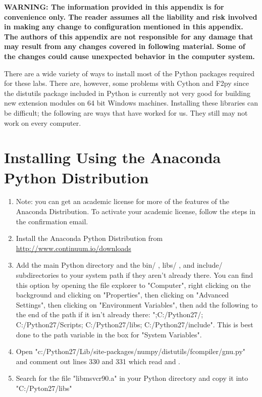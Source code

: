 \label{win64install}


\textbf{{\large WARNING:} The information provided in this appendix is for convenience only.
The reader assumes all the liability and risk involved in making any change to configuration mentioned in this appendix.
The authors of this appendix are not responsible for any damage that may result from any changes covered in following material.
Some of the changes could cause unexpected behavior in the computer system.}

There are a wide variety of ways to install most of the Python packages required for these labs.
There are, however, some problems with Cython and F2py since the distutils package included in Python is currently not very good for building new extension modules on 64 bit Windows machines.
Installing these libraries can be difficult; the following are ways that have worked for us.
They still may not work on every computer.

\section*{Installing Using the Anaconda Python Distribution}
\begin{enumerate}
\item Note: you can get an academic license for more of the features of the Anaconda Distribution.
To activate your academic license, follow the steps in the confirmation email.

\item Install the Anaconda Python Distribution from \url{http://www.continuum.io/downloads}

\item Add the main Python directory and the bin/ , libs/ , and include/ subdirectories to your system path if they aren't already there.
You can find this option by opening the file explorer to "Computer", right clicking on the background and clicking on "Properties", then clicking on "Advanced Settings", then clicking on "Environment Variables", then add the following to the end of the path if it isn't already there: ";C:/Python27/; C:/Python27/Scripts; C:/Python27/libs; C:/Python27/include". This is best done to the path variable in the box for "System Variables".

\item Open "c:/Python27/Lib/site-packages/numpy/distutils/fcompiler/gnu.py" and comment out lines 330 and 331 which read  and .

\item Search for the file "libmsvcr90.a" in your Python directory and copy it into "C:/Pyton27/libs"

\end{enumerate}


